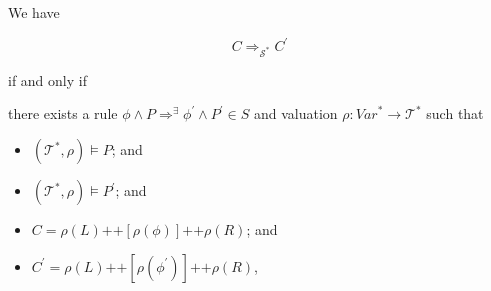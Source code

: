 \begin{lemma}\label{lem:simplifyComposite}
We have
\begin{proofenv}
    \begin{equation*}
        C \Rightarrow_{\mathcal{S}^*} C^\prime
    \end{equation*}
\end{proofenv}
    if and only if
\begin{proofenv}
    there exists a rule $\phi \land P \Rightarrow^\exists \phi^\prime \land P^\prime \in S$
    and valuation $\rho : \mathit{Var}^* \to \mathcal{T}^*$ such that
    \begin{itemize}
        \item $(\mathcal{T}^*, \rho) \vDash P$; and
        \item $(\mathcal{T}^*, \rho) \vDash P^\prime$; and
        \item $C = \rho(L) \texttt{++} [\rho(\phi)] \texttt{++} \rho(R)$; and
        \item $C^\prime = \rho(L) \texttt{++} [\rho(\phi^\prime)] 
        \texttt{++} \rho(R)$,
    \end{itemize}
\end{proofenv}
\end{lemma}
